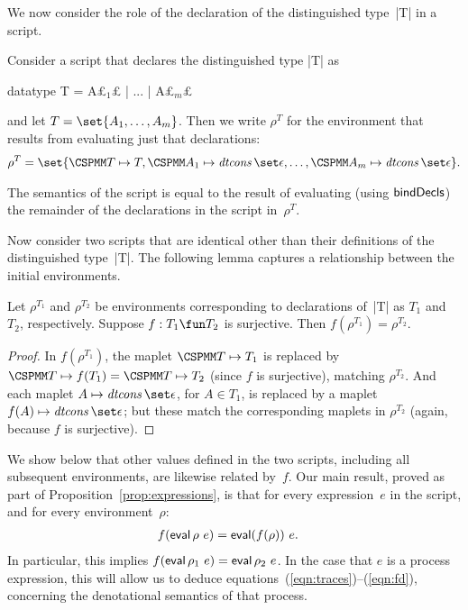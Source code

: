
We now consider the role of the declaration of the distinguished type~|T| in
a script.
%
\begin{definition}
\label{def:initial-env}
Consider a script that declares the distinguished type |T| as
\begin{cspm}
  datatype T = A£$_1$£ | ... | A£$_m$£
\end{cspm}
and let $T = \set{A_1,\ldots, A_m}$.  Then we write $\rho^{T}$ for the
environment that results from evaluating just that declarations:
\begin{eqnarray*}
\rho^T = \set{\M T \mapsto T, \M A_1 \mapsto \dtcons\set\epsilon, \ldots,
   \M A_m \mapsto \dtcons\set\epsilon}. \\
\end{eqnarray*}
\end{definition}
%
The semantics of the script is equal to the result of evaluating (using
$\mathop{\sf bindDecls}$) the remainder of the declarations in the script in~$\rho^T$.

Now consider two scripts that are identical other than their definitions of the
distinguished type~|T|.
The following lemma captures a relationship between the initial environments.
%
\begin{lemma}
\label{lem:distinguished-type-declaration}
Let $\rho^{T_1}$ and $\rho^{T_2}$ be environments corresponding to
declarations of~|T| as $T_1$ and $T_2$, respectively.  Suppose $f: T_1 \fun
T_2$ is surjective.  Then $f(\rho^{T_1}) = \rho^{T_2}$.
\end{lemma}
%
\begin{proof}
In $f(\rho^{T_1})$, the maplet $\M T \mapsto T_1$ is replaced by $\M T \mapsto
f(T_1) = \M T \mapsto T_2$ (since $f$ is surjective), matching $\rho^{T_2}$.
And each maplet $A \mapsto \dtcons\set\epsilon$, for $A \in T_1$, is replaced
by a maplet $f(A) \mapsto \dtcons\set\epsilon$; but these match the
corresponding maplets in $\rho^{T_2}$ (again, because $f$ is surjective).
\end{proof}

We show below that other values defined in the two scripts, including all
subsequent environments, are likewise related by~$f$.
%
Our main result, proved as part of Proposition~\ref{prop:expressions}, is that
for every expression~$e$ in the script, and for every environment~$\rho$:
\begin{eqnarray*}
f(\mathop{\sf eval} \rho ~ e) & = \mathop{\sf eval} (f(\rho)) ~e .
\end{eqnarray*}
%
In particular, this implies $f(\mathop{\sf eval} \rho_1 ~ e) = \mathop{\sf eval} \rho_2 ~e$.  In the
case that $e$ is a process expression, this will allow us to deduce
equations~(\ref{eqn:traces})--(\ref{eqn:fd}), concerning the denotational
semantics of that process.

